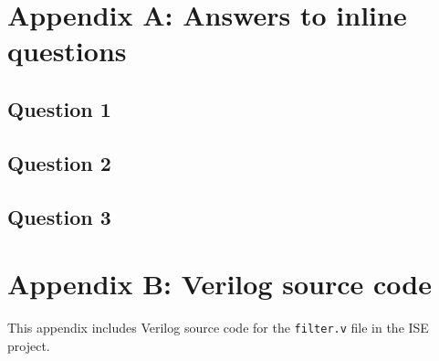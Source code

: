 \section{Appendix A: Answers to inline questions}
\subsection{Question 1}
\subsection{Question 2}
\subsection{Question 3}
\section{Appendix B: Verilog source code}
This appendix includes Verilog source code for the \texttt{filter.v} file in the ISE project.

\begin{verbatim}
\end{verbatim}
